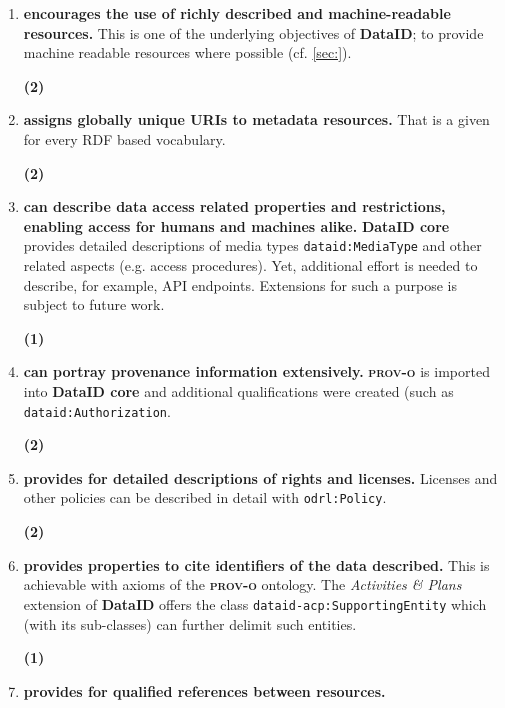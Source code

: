 \documentclass[a4paper,english,twoside,BCOR1.5cm,headsepline,DIV12,appendixprefix,final,12pt]{scrbook}
\newcommand{\dataid}{{\ttfamily\bfseries DataID}\xspace}
\newcommand{\core}{{\ttfamily\bfseries DataID core}\xspace}
\newcommand{\prov}{{\scshape\bfseries prov-o}\xspace}
\newcommand{\prop}[1]{{{\texttt{#1}}}}
\begin{document}
\begin{enumerate}[A]
\item \textbf{encourages the use of richly described and machine-readable resources.} This is one of the underlying objectives of \dataid; to provide machine readable resources where possible (cf. \cref{sec:}). 
\begin{flushright}\color{ForestGreen}\textbf{(2)}\end{flushright}
\item \textbf{assigns globally unique URIs to metadata resources.}
That is a given for every RDF based vocabulary. 
\begin{flushright}\color{ForestGreen}\textbf{(2)}\end{flushright}
\item \textbf{can describe data access related properties and restrictions, enabling access for humans and machines alike.} \core provides detailed descriptions of media types \prop{dataid:MediaType} and other related aspects (e.g. access procedures). Yet, additional effort is needed to describe, for example, API endpoints. Extensions for such a purpose is subject to future work.
\begin{flushright}\color{BurntOrange}\textbf{(1)}\end{flushright}
\item \textbf{can portray provenance information extensively.}
\prov is imported into \core and additional qualifications were created (such as \prop{dataid:Authorization}.
\begin{flushright}\color{ForestGreen}\textbf{(2)}\end{flushright}
\item \textbf{provides for detailed descriptions of rights and licenses.}
Licenses and other policies can be described in detail with \prop{odrl:Policy}.
\begin{flushright}\color{ForestGreen}\textbf{(2)}\end{flushright}
\item \textbf{provides properties to cite identifiers of the data described.}
This is achievable with axioms of the \prov ontology. The \textit{Activities \& Plans} extension of \dataid offers the class \prop{dataid-acp:SupportingEntity} which (with its sub-classes) can further delimit such entities.
\begin{flushright}\color{BurntOrange}\textbf{(1)}\end{flushright}
\item \textbf{provides for qualified references between resources.}

\end{enumerate}
\end{document}
